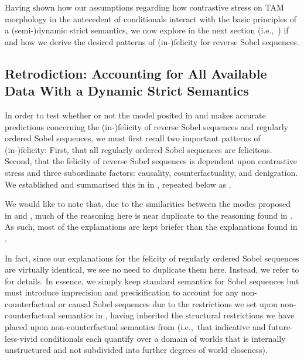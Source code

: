 Having shown how our assumptions regarding how contrastive stress on TAM morphology in the antecedent of conditionals interact with the basic principles of a (semi-)dynamic strict semantics, we now explore in the next section (i.e.,~) if and how we derive the desired patterns of (in-)felicity for reverse Sobel sequences.

\subsection{Retrodiction: Accounting for All Available Data With a Dynamic Strict Semantics}
In order to test whether or not the model posited in  and  makes accurate predictions concerning the (in-)felicity of reverse Sobel sequences and regularly ordered Sobel sequences, we must first recall two important patterns of (in-)felicity: First, that all regularly ordered Sobel sequences are felicitous. Second, that the felicity of reverse Sobel sequences is dependent upon contrastive stress and three subordinate factors: causality, counterfactuality, and denigration. We established and summarised this in  in , repeated below as .
\begin{table}[!htb]
\end{table}

We would like to note that, due to the similarities between the modes proposed in  and , much of the reasoning here is near duplicate to the reasoning found in . As such, most of the explanations are kept briefer than the explanations found in .

In fact, since our explanations for the felicity of regularly ordered Sobel sequences are virtually identical, we see no need to duplicate them here. Instead, we refer to  for details. In essence, we simply keep  standard semantics for Sobel sequences but must introduce imprecision and precisification to account for any non-counterfactual or causal Sobel sequences due to the restrictions we set upon non-counterfactual semantics in , having inherited the structural restrictions we have placed upon non-counterfactual semantics from  (i.e.,~that indicative and future-less-vivid conditionals each quantify over a domain of worlds that is internally unstructured and not subdivided into further degrees of world closeness).

